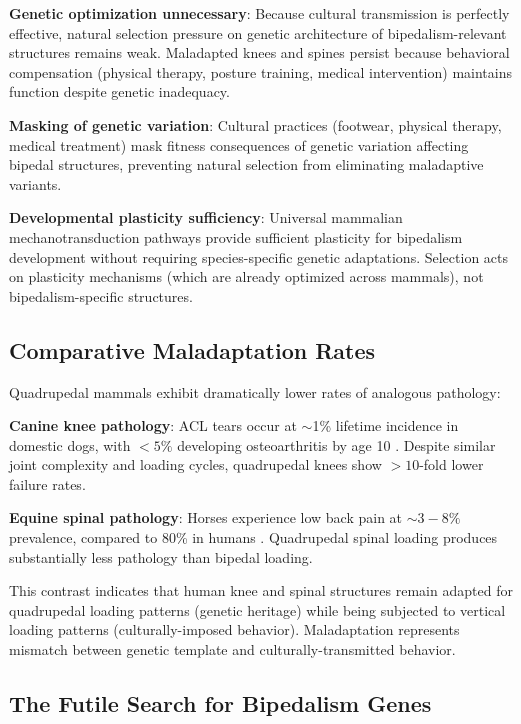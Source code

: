 \textbf{Genetic optimization unnecessary}: Because cultural transmission is perfectly effective, natural selection pressure on genetic architecture of bipedalism-relevant structures remains weak. Maladapted knees and spines persist because behavioral compensation (physical therapy, posture training, medical intervention) maintains function despite genetic inadequacy.

\textbf{Masking of genetic variation}: Cultural practices (footwear, physical therapy, medical treatment) mask fitness consequences of genetic variation affecting bipedal structures, preventing natural selection from eliminating maladaptive variants.

\textbf{Developmental plasticity sufficiency}: Universal mammalian mechanotransduction pathways provide sufficient plasticity for bipedalism development without requiring species-specific genetic adaptations. Selection acts on plasticity mechanisms (which are already optimized across mammals), not bipedalism-specific structures.

\subsection{Comparative Maladaptation Rates}

Quadrupedal mammals exhibit dramatically lower rates of analogous pathology:

\textbf{Canine knee pathology}: ACL tears occur at $\sim$1\% lifetime incidence in domestic dogs, with $<5\%$ developing osteoarthritis by age 10 \citep{witsberger2008prevalence}. Despite similar joint complexity and loading cycles, quadrupedal knees show $>10$-fold lower failure rates.

\textbf{Equine spinal pathology}: Horses experience low back pain at $\sim 3-8\%$ prevalence, compared to 80\% in humans \citep{jeffcott1980disorders}. Quadrupedal spinal loading produces substantially less pathology than bipedal loading.

This contrast indicates that human knee and spinal structures remain adapted for quadrupedal loading patterns (genetic heritage) while being subjected to vertical loading patterns (culturally-imposed behavior). Maladaptation represents mismatch between genetic template and culturally-transmitted behavior.

\subsection{The Futile Search for Bipedalism Genes}

